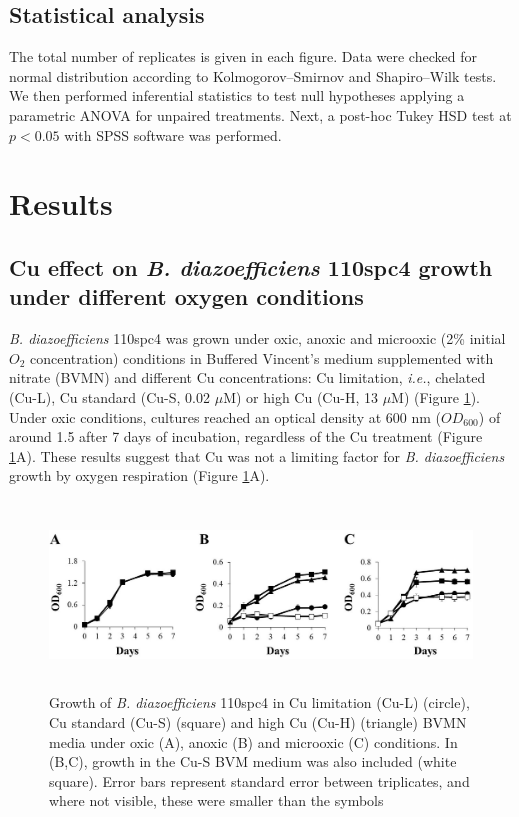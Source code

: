 \documentclass[a4paper,11pt]{article}
\begin{document}
\subsection{Statistical analysis}
The total number of replicates is given in each figure. Data were checked for normal
distribution according to Kolmogorov–Smirnov and Shapiro–Wilk tests. We then performed
inferential statistics to test null hypotheses applying a parametric ANOVA for unpaired
treatments. Next, a post-hoc Tukey HSD test at $p<0.05$ with SPSS software was performed.

\section{Results}
\subsection{Cu effect on {\em B. diazoefficiens} 110spc4 growth under different oxygen conditions}
{\em B. diazoefficiens} 110spc4 was grown under oxic, anoxic and microoxic (2\% initial $O_2$
concentration) conditions in Buffered Vincent’s medium \cite{serventi2012copper} supplemented with nitrate
(BVMN) and different Cu concentrations: Cu limitation, {\em i.e.}, chelated (Cu-L), Cu standard
(Cu-S, 0.02 $\mu$M) or high Cu (Cu-H, 13 $\mu$M) (Figure \ref{fig:figure1}). Under oxic conditions, cultures
reached an optical density at 600 nm ($OD_600$) of around 1.5 after 7 days of incubation,
regardless of the Cu treatment (Figure \ref{fig:figure1}A). These results suggest that Cu was not a limiting
factor for {\em B. diazoefficiens} growth by oxygen respiration (Figure \ref{fig:figure1}A). 
\begin{figure}[h!]
\centering
\includegraphics[height=5cm]{Images/Figure1.jpg}
\caption{Growth of {\em B. diazoefficiens} 110spc4 in Cu limitation (Cu-L) (circle), Cu standard (Cu-S) (square) and
high Cu (Cu-H) (triangle) BVMN media under oxic (A), anoxic (B) and microoxic (C) conditions. In (B,C),
growth in the Cu-S BVM medium was also included (white square). Error bars represent standard error between
triplicates, and where not visible, these were smaller than the symbols}
\label{fig:figure1}
\end{figure}
\end{document}
